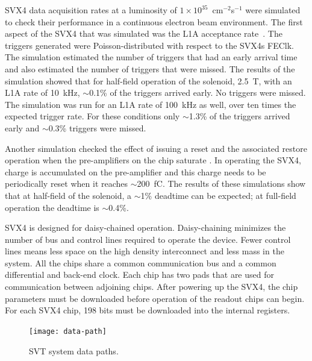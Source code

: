 SVX4 data acquisition rates at a luminosity of 
$1\times10^{35}$~cm$^{-2}$s$^{-1}$ were simulated to check their performance 
in a continuous electron beam environment.  The first aspect of the SVX4 
that was simulated was the L1A acceptance rate~\cite{CN2006-13}.  The 
triggers generated were Poisson-distributed with respect to the SVX4s FEClk.  
The simulation estimated the number of triggers that had an early arrival 
time and also estimated the number of triggers that were missed.  The results 
of the simulation showed that for half-field operation of the solenoid, 2.5~T, 
with an L1A rate of 10~kHz, $\sim$0.1\% of the triggers arrived early.  No 
triggers were missed.  The simulation was run for an L1A rate of 100~kHz as 
well, over ten times the expected trigger rate.  For these conditions only 
$\sim$1.3\% of the triggers arrived early and $\sim$0.3\% triggers were 
missed.

Another simulation checked the effect of issuing a reset and the associated 
restore operation when the pre-amplifiers on the chip saturate
\cite{CN2006-24}.  In operating the SVX4, charge is accumulated on the 
pre-amplifier and this charge needs to be periodically reset when it reaches 
$\sim$200~fC.  The results of these simulations show that at half-field of
the solenoid, a $\sim$1\% deadtime can be expected; at full-field operation 
the deadtime is $\sim$0.4\%.

SVX4 is designed for daisy-chained operation.  Daisy-chaining minimizes 
the number of bus and control lines required to operate the device.  Fewer 
control lines means less space on the high density interconnect and less 
mass in the system.  All the chips share a common communication bus and a 
common differential and back-end clock.  Each chip has two pads that are 
used for communication between adjoining chips.  After powering up the SVX4, 
the chip parameters must be downloaded before operation of the readout chips 
can begin.  For each SVX4 chip, 198 bits must be downloaded into the 
internal registers.

\begin{figure}[htbp]
\centering
\texttt{[image: data-path]}
\caption{\small{SVT system data paths.}}
\label{fig:data-path}
\end{figure}

